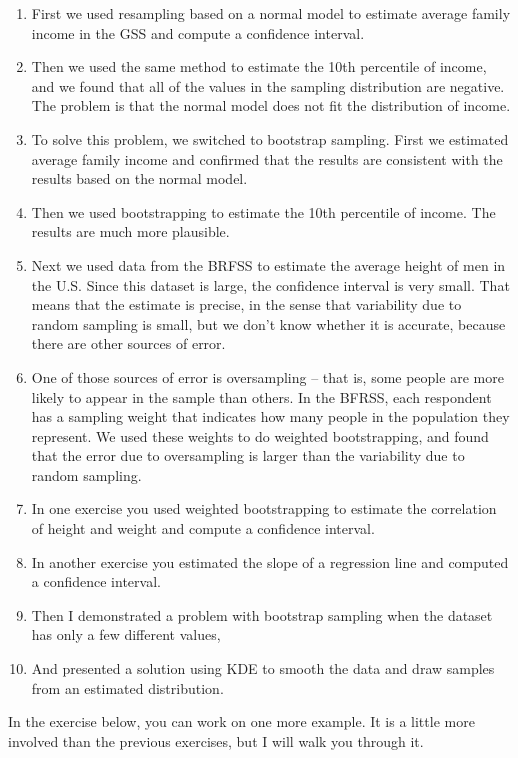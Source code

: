 \begin{enumerate}
\def\labelenumi{\arabic{enumi}.}
\item
  First we used resampling based on a normal model to estimate average
  family income in the GSS and compute a confidence interval.
\item
  Then we used the same method to estimate the 10th percentile of
  income, and we found that all of the values in the sampling
  distribution are negative. The problem is that the normal model does
  not fit the distribution of income.
\item
  To solve this problem, we switched to bootstrap sampling. First we
  estimated average family income and confirmed that the results are
  consistent with the results based on the normal model.
\item
  Then we used bootstrapping to estimate the 10th percentile of income.
  The results are much more plausible.
\item
  Next we used data from the BRFSS to estimate the average height of men
  in the U.S. Since this dataset is large, the confidence interval is
  very small. That means that the estimate is precise, in the sense that
  variability due to random sampling is small, but we don't know whether
  it is accurate, because there are other sources of error.
\item
  One of those sources of error is oversampling -- that is, some people
  are more likely to appear in the sample than others. In the BFRSS,
  each respondent has a sampling weight that indicates how many people
  in the population they represent. We used these weights to do weighted
  bootstrapping, and found that the error due to oversampling is larger
  than the variability due to random sampling.
\item
  In one exercise you used weighted bootstrapping to estimate the
  correlation of height and weight and compute a confidence interval.
\item
  In another exercise you estimated the slope of a regression line and
  computed a confidence interval.
\item
  Then I demonstrated a problem with bootstrap sampling when the dataset
  has only a few different values,
\item
  And presented a solution using KDE to smooth the data and draw samples
  from an estimated distribution.
\end{enumerate}

In the exercise below, you can work on one more example. It is a little
more involved than the previous exercises, but I will walk you through
it.

